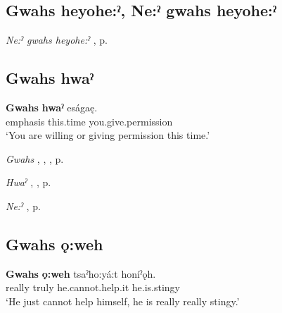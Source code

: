 \subsection*{\textbf{Gwahs heyohe:ˀ, Ne:ˀ gwahs heyohe:ˀ} } \label{p:[gwahs heyohe:ˀ]}


\begin{CayugaRelated}
\item \textit{Ne:ˀ gwahs heyohe:ˀ} , p. \pageref{p:[ne:ˀ gwahs heyohe:ˀ]}
\end{CayugaRelated}


\subsection*{\textbf{Gwahs hwaˀ} } \label{p:[gwahs hwaˀ]}

\ea
\label{ex:gpar103}
\gll \textbf{Gwahs} \textbf{hwaˀ} eságaę.\\
emphasis this.time you.give.permission\\
\glt ‘You are willing or giving permission this time.’
\z

\begin{CayugaRelated}
\item \textit{Gwahs} , , , p. \pageref{p:[gwahs] ‘really’}\\
\item \textit{Hwaˀ} , , p. \pageref{p:[hwaˀ]}\\
\item \textit{Ne:ˀ} , p. \pageref{p:[ne:ˀ] `it is’}
\end{CayugaRelated}


\subsection*{\textbf{Gwahs ǫ:weh} } \label{p:[gwahs ǫ:weh]}

\ea
\label{ex:gpar104}
\gll \textbf{Gwahs} \textbf{ǫ:weh} tsaˀho:yá:t honíˀǫh.\\
really truly he.cannot.help.it he.is.stingy\\
\glt ‘He just cannot help himself, he is really really stingy.’
\z

